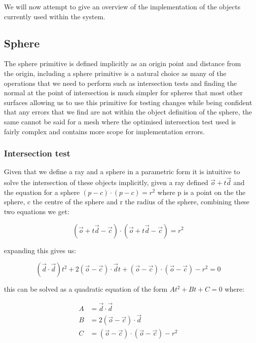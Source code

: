 We will now attempt to give an overview of the implementation of the objects currently used within the system.

\subsection{Sphere}
The sphere primitive is defined implicitly as an origin point and distance from the origin, including a sphere primitive is
a natural choice as many of the operations that we need to perform such as intersection tests and finding the normal at the
point of intersection is much simpler for spheres that most other surfaces allowing us to use this primitive for testing
changes while being confident that any errors that we find are not within the object definition of the sphere, the same cannot
be said for a mesh where the optimised intersection test used is fairly complex and contains more scope for implementation errors.

\subsubsection{Intersection test}
Given that we define a ray and a sphere in a parametric form it is intuitive to solve the intersection of these objects implicitly,
given a ray defined $\vec{o} + t \vec{d}$ and the equation for a sphere $(p - c) \cdot (p - c) = r^2$ where p is a point on the the
sphere, c the centre of the sphere and r the radius of the sphere, combining these two equations we get:

\begin{equation*}
(\vec{o} + t\vec{d} -\vec{c}) \cdot (\vec{o} + t\vec{d} - \vec{c}) = r^2
\end{equation*}

expanding this gives us:

\begin{equation*}
(\vec{d} \cdot \vec{d})t^2 + 2(\vec{o} - \vec{c}) \cdot \vec{d}t + (\vec{o} - \vec{c}) \cdot (\vec{o} - \vec{c}) - r^2 = 0
\end{equation*}

this can be solved as a quadratic equation of the form $At^2 + Bt + C = 0$ where:

\begin{align*}
A &= \vec{d} \cdot \vec{d}\\
B &= 2(\vec{o} - \vec{c}) \cdot \vec{d}\\
C &= (\vec{o} - \vec{c}) \cdot (\vec{o} - \vec{c}) - r^2\\
\end{align*}

